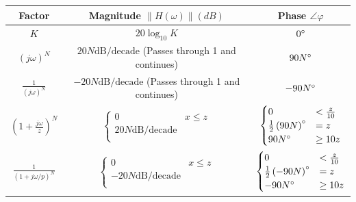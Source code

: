 \documentclass[10pt,letterpaper,final,twoside,notitlepage]{article}
\begin{document}
	\vspace{-12mm}
	\begin{table}[!h]%
		\centering
		\renewcommand{\arraystretch}{2.35}
		\begin{tabular}{|c|c|c|} %
			\hline
			\textbf{Factor} & \textbf{Magnitude} $\lVert H\left( \omega \right) \rVert (dB)$ & \textbf{Phase} $ \angle \varphi$ \\ \hline
			$K$ & $20 \log_{10} K$ & $0 \degree$ \\ \hline
			$\left( j \omega \right)^{N}$ & $ 20N \text{dB/decade}$ (Passes through 1 and continues) & $90N \degree$ \\ \hline
			$\frac{1}{\left( j \omega \right)^{N}}$ & $-20N \text{dB/decade}$ (Passes through 1 and continues) & $-90N \degree$ \\ \hline
			
			$\left( 1 + \frac{j \omega}{z} \right)^{N}$ &
				$\begin{cases}
					0 & x \leq z \\
					20N \text{dB/decade} \\
				\end{cases}$ 
				&
				$\begin{cases}
					0 & < \frac{z}{10} \\
					\frac{1}{2} \left( 90N \right) \degree & =z \\
					90N \degree & \geq 10z \\
				\end{cases}$ 
				\\ \hline
				
				$\frac{1}{\left( 1 + j \omega / p \right)^{N}}$ & 
					$\begin{cases}
							0 & x \leq z \\
							-20N \text{dB/decade} \\
						\end{cases}$ 
					& 
					$\begin{cases}
						0 & < \frac{z}{10} \\
						\frac{1}{2} \left( -90N \right) \degree & =z \\
						-90N \degree & \geq 10z \\
					\end{cases}$ 
					\\ \hline
				

\end{tabular}
\end{table}
\end{document}
